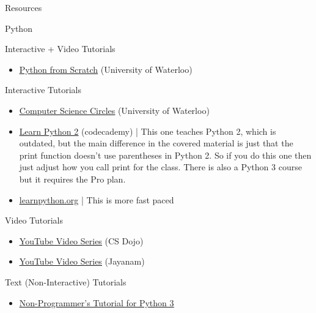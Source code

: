 \documentclass[11pt]{resume}
\begin{document}
\begin{section}{Resources}
\begin{subsection}{Python}
\begin{subsubsection}{Interactive + Video Tutorials}
\begin{itemize}
\item \textcolor{blue}{\underline{\href{https://open.cs.uwaterloo.ca/python-from-scratch/}{Python from Scratch}}}
(University of Waterloo)
\end{itemize}
\end{subsubsection}
\begin{subsubsection}{Interactive Tutorials}
\begin{itemize}
\item \textcolor{blue}{\underline{\href{https://cscircles.cemc.uwaterloo.ca/}{Computer Science Circles}}}
(University of Waterloo)
\item \textcolor{blue}{\underline{\href{https://www.codecademy.com/learn/learn-python}{Learn Python 2}}}
(codecademy)
|
This one teaches Python 2, which is outdated, but the main difference in the covered material
is just that the print function doesn't use parentheses in Python 2. So if you do this one then 
just adjust how you call print for the class. There is also a Python 3 course but it requires the Pro plan.
\item \textcolor{blue}{\underline{\href{https://www.learnpython.org/}{learnpython.org}}}
|
This is more fast paced
\end{itemize}
\end{subsubsection}
\begin{subsubsection}{Video Tutorials}
\begin{itemize}
\item \textcolor{blue}{\underline{\href{https://www.youtube.com/watch?v=Z1Yd7upQsXY\&list=PLBZBJbE\_rGRWeh5mIBhD-hhDwSEDxogDg\&ab\_channel=CSDojo}{YouTube Video Series}}}
(CS Dojo)
\item \textcolor{blue}{\underline{\href{https://www.youtube.com/watch?v=9DVK2Khx8Ys\&list=PLboXykqtm8dy\_DNg1NZiS08Dnyj35PWXw\&index=4}{YouTube Video Series}}}
(Jayanam)
\end{itemize}
\end{subsubsection}
\begin{subsubsection}{Text (Non-Interactive) Tutorials}
\begin{itemize}
\item \textcolor{blue}{\underline{\href{https://en.wikibooks.org/wiki/Non-Programmer\%27s\_Tutorial\_for\_Python\_3}{Non-Programmer's Tutorial for Python 3}}}

\end{itemize}
\end{subsubsection}
\end{subsection}
\end{section}
\end{document}
